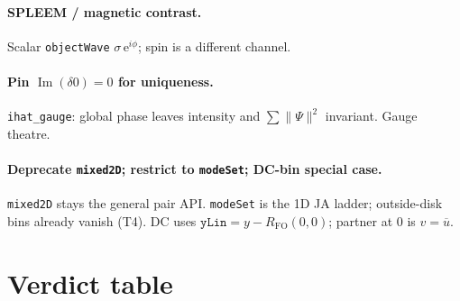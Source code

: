 \documentclass[11pt,a4paper]{article}
\theoremstyle{definition}
\theoremstyle{remark}
\newcommand{\ee}{\mathrm{e}}
\newcommand{\conj}[1]{\overline{#1}}
\newcommand{\norm}[1]{\lVert#1\rVert}
\newcommand{\RFO}{R_{\mathrm{FO}}}
\begin{document}
\paragraph{SPLEEM / magnetic contrast.}
Scalar \texttt{objectWave} $\sigma\,\ee^{i\phi}$; spin is a different
channel.

\paragraph{Pin $\operatorname{Im}(\delta 0)=0$ for uniqueness.}
\texttt{ihat\_gauge}: global phase leaves intensity and
$\sum\norm{\Psi}^2$ invariant. Gauge theatre.

\paragraph{Deprecate \texttt{mixed2D}; restrict to \texttt{modeSet}; DC-bin special case.}
\texttt{mixed2D} stays the general pair API.
\texttt{modeSet} is the 1D JA ladder; outside-disk bins already vanish
(T4).
DC uses $\texttt{yLin}=y-\RFO(0,0)$; partner at $0$ is $v=\conj{u}$.

\section{Verdict table}
\label{sec:table}
\end{document}
